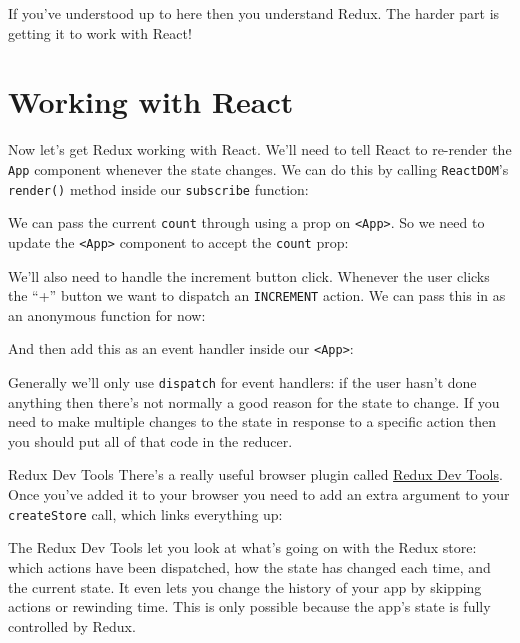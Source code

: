 If you've understood up to here then you understand Redux. The harder part is getting it to work with React!




\section{Working with React}

Now let's get Redux working with React. We'll need to tell React to re-render the \texttt{App} component whenever the state changes. We can do this by calling \texttt{ReactDOM}'s \texttt{render()} method inside our \texttt{subscribe} function:


We can pass the current \texttt{count} through using a prop on \texttt{<App>}. So we need to update the \texttt{<App>} component to accept the \texttt{count} prop:


We'll also need to handle the increment button click. Whenever the user clicks the ``+'' button we want to dispatch an \texttt{INCREMENT} action. We can pass this in as an anonymous function for now:


And then add this as an event handler inside our \texttt{<App>}:



Generally we'll only use \texttt{dispatch} for event handlers: if the user hasn't done anything then there's not normally a good reason for the state to change. If you need to make multiple changes to the state in response to a specific action then you should put all of that code in the reducer.


\pagebreak


\begin{infobox}{Redux Dev Tools}
    There's a really useful browser plugin called \href{https://github.com/zalmoxisus/redux-devtools-extension}{Redux Dev Tools}.
    \\

    Once you've added it to your browser you need to add an extra argument to your \texttt{createStore} call, which links everything up:


    The Redux Dev Tools let you look at what's going on with the Redux store: which actions have been dispatched, how the state has changed each time, and the current state. It even lets you change the history of your app by skipping actions or rewinding time. This is only possible because the app's state is fully controlled by Redux.
\end{infobox}


